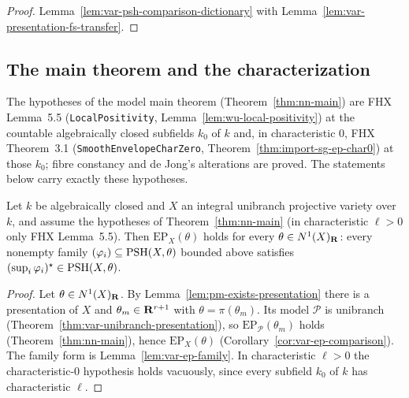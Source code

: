 \begin{proof}
Lemma~\ref{lem:var-psh-comparison-dictionary} with Lemma~\ref{lem:var-presentation-fs-transfer}.
\end{proof}

\subsection{The main theorem and the characterization}

The hypotheses of the model main theorem (Theorem~\ref{thm:nn-main}) are FHX Lemma~5.5
(\texttt{LocalPositivity}, Lemma~\ref{lem:wu-local-positivity}) at the countable algebraically
closed subfields $k_0$ of $k$ and, in characteristic $0$, FHX Theorem~3.1
(\texttt{SmoothEnvelopeCharZero}, Theorem~\ref{thm:import-sg-ep-char0}) at those $k_0$; fibre
constancy and de Jong's alterations are proved. The statements below carry exactly these
hypotheses.

\begin{theorem}
\label{thm:var-main}
\leanok
{}
Let $k$ be algebraically closed and $X$ an integral unibranch projective variety over $k$, and
assume the hypotheses of Theorem~\ref{thm:nn-main} (in characteristic $\ell>0$ only FHX
Lemma~5.5). Then $\mathrm{EP}_X(\theta)$ holds for every $\theta\in N^1(X)_{\mathbf{R}}$: every nonempty
family $(\varphi_i)\subseteq\operatorname{PSH}(X,\theta)$ bounded above satisfies
$(\sup_i\varphi_i)^\star\in\operatorname{PSH}(X,\theta)$.
\end{theorem}

\begin{proof}
Let $\theta\in N^1(X)_{\mathbf{R}}$. By Lemma~\ref{lem:pm-exists-presentation} there is a presentation of
$X$ and $\theta_m\in\mathbf{R}^{r+1}$ with $\theta=\pi(\theta_m)$. Its model $\mathcal P$ is unibranch
(Theorem~\ref{thm:var-unibranch-presentation}), so $\mathrm{EP}_{\mathcal P}(\theta_m)$ holds
(Theorem~\ref{thm:nn-main}), hence $\mathrm{EP}_X(\theta)$
(Corollary~\ref{cor:var-ep-comparison}). The family form is
Lemma~\ref{lem:var-ep-family}. In characteristic $\ell>0$ the characteristic-$0$ hypothesis
holds vacuously, since every subfield $k_0$ of $k$ has characteristic $\ell$.
\end{proof}

